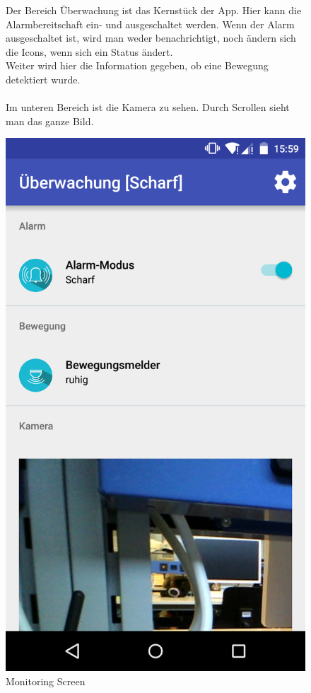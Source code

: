 \begin{figure}[htbp]
	\begin{minipage}{0.6\textwidth} 
Der Bereich Überwachung ist das Kernstück der App. Hier kann die Alarmbereitschaft ein- und ausgeschaltet werden. Wenn der Alarm ausgeschaltet ist, wird man weder benachrichtigt, noch ändern sich die Icons, wenn sich ein Status ändert.\\
Weiter wird hier die Information gegeben, ob eine Bewegung detektiert wurde. \\ \\
Im unteren Bereich ist die Kamera zu sehen. Durch Scrollen sieht man das ganze Bild. 
	\end{minipage}
	\hfill
	\begin{minipage}{0.32\textwidth}
		\includegraphics[scale=0.12]{appendix/img/AppScreenshots/Screenshot5}
		\caption{Monitoring Screen}
		\label{fig:screenshot_5}
	\end{minipage}
\end{figure}
